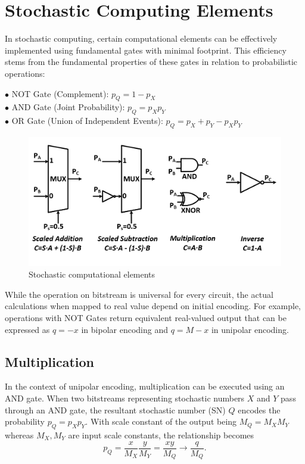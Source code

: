 \section{Stochastic Computing Elements}
\label{sec:review:sec3}


In stochastic computing, certain computational elements can be effectively implemented using fundamental gates with minimal footprint. This efficiency stems from the fundamental properties of these gates in relation to probabilistic operations:

$\bullet$ NOT Gate (Complement): $p_Q  = 1 - p_X $ \\
$\bullet$ AND Gate (Joint Probability): $p_Q  = p_X p_Y $ \\
$\bullet$ OR Gate (Union of Independent Events): $p_Q  = p_X + p_Y - p_Xp_Y $

\begin{figure}[htb]
	\includegraphics[width=12cm]{gfx/SC elements.png}
	\caption{Stochastic computational elements}
	\label{fig:system:example1}
\end{figure}

While the operation on bitstream is universal for every circuit, the actual calculations when mapped to real value depend on initial encoding. For example, operations with NOT Gates  return equivalent real-valued output that can be expressed as $q = -x$ in bipolar encoding and $q = M-x$ in unipolar encoding. 

\subsection{Multiplication}

In the context of unipolar encoding, multiplication can be executed using an AND gate. When two bitstreams representing stochastic numbers $X $ and $Y $ pass through an AND gate, the resultant stochastic number (SN) $Q $ encodes the probability $p_Q  = p_X p_Y $. With scale constant of the output 
being  $M_Q  = M_X M_Y$ whereas $M_X, M_Y$ are input scale constants, the relationship becomes $$p_Q  = \frac{x}{M_X}\frac{y}{M_Y} = \frac{xy}{M_Q } \rightarrow \frac{q}{M_Q } .$$

